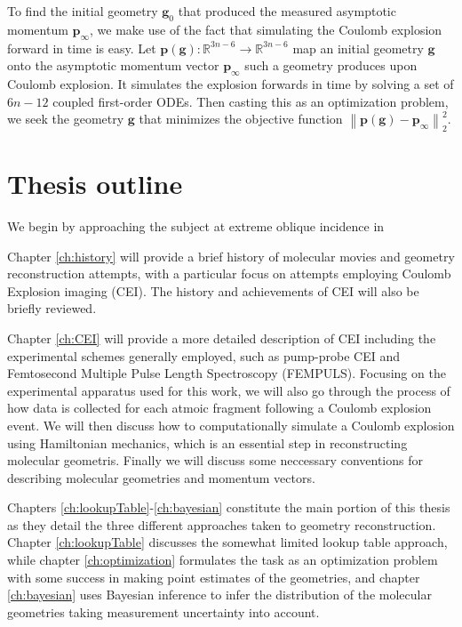 To find the initial geometry $\mathbf{g}_0$ that produced the measured asymptotic momentum $\mathbf{p}_\infty$, we make use of the fact that simulating the Coulomb explosion forward in time is easy. Let $\mathbf{p}(\mathbf{g}) : \mathbb{R}^{3n-6} \rightarrow \mathbb{R}^{3n-6}$ map an initial geometry $\mathbf{g}$ onto the asymptotic momentum vector $\mathbf{p}_\infty$ such a geometry produces upon Coulomb explosion. It simulates the explosion forwards in time by solving a set of $6n-12$ coupled first-order ODEs. Then casting this as an optimization problem, we seek the geometry $\mathbf{g}$ that minimizes the objective function $\left\| \mathbf{p}(\mathbf{g}) - \mathbf{p}_\infty \right\|_2^2$.

\section{Thesis outline}

We begin by approaching the subject at extreme oblique incidence in

Chapter \ref{ch:history} will provide a brief history of molecular movies and geometry reconstruction attempts, with a particular focus on attempts employing Coulomb Explosion imaging (CEI). The history and achievements of CEI will also be briefly reviewed.

Chapter \ref{ch:CEI} will provide a more detailed description of CEI including the experimental schemes generally employed, such as pump-probe CEI and Femtosecond Multiple Pulse Length Spectroscopy (FEMPULS). Focusing on the experimental apparatus used for this work, we will also go through the process of how data is collected for each atmoic fragment following a Coulomb explosion event. We will then discuss how to computationally simulate a Coulomb explosion using Hamiltonian mechanics, which is an essential step in reconstructing molecular geometris. Finally we will discuss some neccessary conventions for describing molecular geometries and momentum vectors.

Chapters \ref{ch:lookupTable}-\ref{ch:bayesian} constitute the main portion of this thesis as they detail the three different approaches taken to geometry reconstruction. Chapter \ref{ch:lookupTable} discusses the somewhat limited lookup table approach, while chapter \ref{ch:optimization} formulates the task as an optimization problem with some success in making point estimates of the geometries, and chapter \ref{ch:bayesian} uses Bayesian inference to infer the distribution of the molecular geometries taking measurement uncertainty into account.